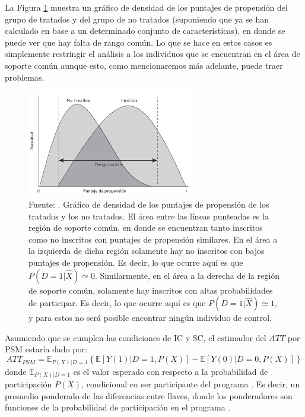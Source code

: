 \documentclass[../../main.tex]{subfiles}
\begin{document}
La Figura \ref{fig:common-support} muestra un gráfico de densidad de los puntajes de
propensión del grupo de tratados y del grupo de no tratados (suponiendo que ya se han
calculado en base a un determinado conjunto de características), en donde se puede ver que
hay falta de rango común. Lo que se hace en estos casos es simplemente restringir el
análisis a los individuos que se encuentran en el área de soporte común aunque esto, como
mencionaremos más adelante, puede traer problemas.

\begin{figure}[h!]
    \centering
    \includegraphics[width=0.65\textwidth]{figs/soporte-comun.png}
    \caption{Fuente: \cite{gertler-2016}. Gráfico de densidad de los puntajes de
    propensión de los tratados y los no tratados. El área entre las líneas punteadas es la
    región de soporte común, en donde se encuentran tanto inscritos como no inscritos con
    puntajes de propensión similares. En el área a la izquierda de dicha región solamente
    hay no inscritos con bajos puntajes de propensión. Es decir, lo que ocurre aquí es que
    \(P(D=1|\hat{X}) \simeq 0\). Similarmente, en el área a la derecha de la región de
    soporte común, solamente hay inscritos con altas probabilidades de participar. Es
    decir, lo que ocurre aquí es que \(P(D=1|\hat{X}) \simeq 1\), y para estos no será
    posible encontrar ningún individuo de control.}
    \label{fig:common-support}
\end{figure}

Asumiendo que se cumplen las condiciones de IC y SC, el estimador del \(ATT\) por PSM
estaría dado por:
\begin{equation}
ATT_{PSM} = \mathbb{E}_{P(X)|D=1}
    \left\{
        \mathbb{E}\left[Y(1)|D=1, P(X)\right] - \mathbb{E}\left[Y(0)|D=0, P(X)\right]
    \right\}
    \label{ATT-PSM}
\end{equation}
donde \(\mathbb{E}_{P(X)|D=1}\) es el valor esperado con respecto a la probabilidad de
participación \(P(X)\), condicional en ser participante del programa \cite{bernal}. Es
decir, un promedio ponderado de las diferencias entre llaves, donde los ponderadores
son funciones de la probabilidad de participación en el programa \cite{bernal}.
\end{document}
